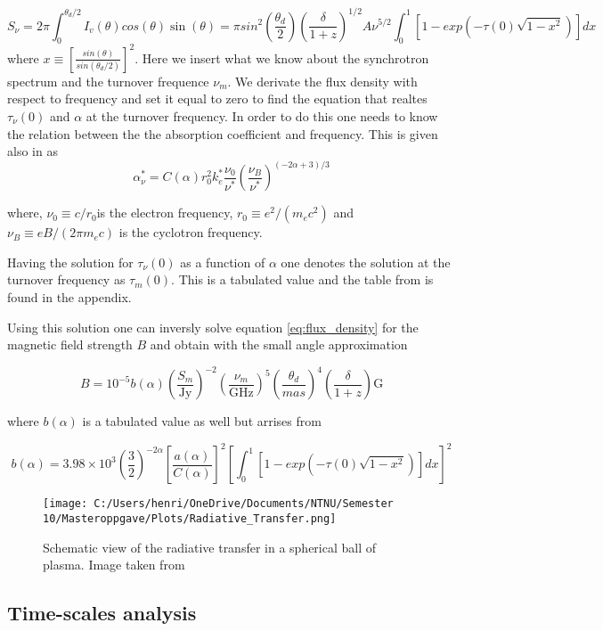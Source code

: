 \begin{equation}
    \label{eq:flux_density}
    S_\nu = 2\pi \int_0^{\theta_d/2} I_v(\theta)cos(\theta)\sin(\theta) = \pi sin^2(\frac{\theta_d}{2})(\frac{\delta}{1+z})^{1/2}A \nu^{5/2} \int_0^1[1-exp(-\tau(0)\sqrt{1-x^2})]dx
\end{equation}
where $x \equiv \left[\frac{sin(\theta)}{sin(\theta_d/2)}\right]^2$.
Here we insert what we know about the synchrotron spectrum and the turnover frequence $\nu_m$. We derivate the flux density with respect to frequency and set it equal to zero to find the equation that realtes $\tau_\nu(0)$ and $\alpha$ at the turnover frequency. In order to do this one needs to know the relation between the the absorption coefficient and frequency. This is given also in \cite{Hirotani_2005} as 
\begin{equation}
    \alpha_\nu^* = C(\alpha) r_0^2 k_e^*\frac{\nu_0}{\nu^*}(\frac{\nu_B}{\nu^*})^{(-2\alpha +3)/3}
\end{equation} 

where, $\nu_0 \equiv c/r_0$is the electron frequency, $r_0 \equiv e^2/(m_e c^2)$ and  
$\nu_B \equiv eB/(2\pi m_e c)$ is the cyclotron frequency. 

Having the solution for $\tau_\nu(0)$ as a function of $\alpha$ one denotes the solution at the turnover frequency as $\tau_m(0)$. This is a tabulated value and the table from \cite{Hirotani_2005} is found in the appendix.

Using this solution one can inversly solve equation \ref{eq:flux_density} for the magnetic field strength $B$ and obtain with the small angle approximation 

\begin{equation}
    B =   10^{-5} b(\alpha) \left(\frac{S_m}{\text{Jy}}\right)^{-2}\left(\frac{\nu_m}{\text{GHz}}\right)^{5}\left(\frac{\theta_d}{mas}\right)^{4}\left(\frac{\delta}{1+z}\right) \text{G}
\end{equation}

where $b(\alpha)$ is a tabulated value as well but arrises from 

\begin{equation}
    b(\alpha) = 3.98 \times 10^{3} \left(\frac{3}{2}\right)^{-2\alpha} \left[\frac{a(\alpha)}{C(\alpha)}\right]^{2} \left[\int_0^1[1-exp(-\tau(0)\sqrt{1-x^2})]dx\right]^2
\end{equation}


\begin{figure}
    \centering
    \texttt{[image: C:/Users/henri/OneDrive/Documents/NTNU/Semester 10/Masteroppgave/Plots/Radiative\_Transfer.png]}
    \caption{Schematic view of the radiative transfer in a spherical ball of plasma. Image taken from \cite{Hirotani_2005}}
    \label{fig:Radiative_transfer}
\end{figure}
\subsection{Time-scales analysis}

